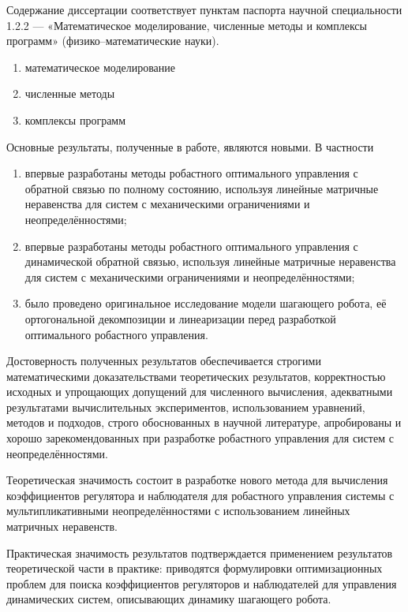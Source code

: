 {\compliances} 

Содержание диссертации соответствует пунктам паспорта научной специальности 1.2.2 --- «Математическое моделирование, численные методы и комплексы программ» (физико--математические науки).
\begin{enumerate}[beginpenalty=10000]
	\item математическое моделирование
	\item численные методы
	\item комплексы программ
\end{enumerate}

{\novelty}

Основные результаты, полученные в работе, являются новыми. В частности
\begin{enumerate}[beginpenalty=10000] %
	\item впервые разработаны методы робастного оптимального управления с обратной связью по полному состоянию, используя линейные матричные неравенства для систем с механическими ограничениями и неопределённостями;
	\item впервые разработаны методы робастного оптимального управления с динамической обратной связью, используя линейные матричные неравенства для систем с механическими ограничениями и неопределённостями;
	\item было проведено оригинальное исследование модели шагающего робота, её ортогональной декомпозиции и линеаризации перед разработкой оптимального робастного управления.
\end{enumerate}

{\probation}

Достоверность полученных результатов обеспечивается строгими математическими доказательствами теоретических результатов, корректностью исходных и упрощающих допущений для численного вычисления, адекватными результатами вычислительных экспериментов, использованием уравнений, методов и подходов, строго обоснованных в научной литературе, апробированы и хорошо зарекомендованных при разработке робастного управления для систем с неопределённостями. 

{\influence} 

Теоретическая значимость состоит в разработке нового метода для вычисления коэффициентов регулятора и наблюдателя для робастного управления системы с мультипликативными неопределённостями с использованием линейных матричных неравенств.

Практическая значимость результатов подтверждается применением результатов теоретической части в практике: приводятся формулировки оптимизационных проблем для поиска коэффициентов регуляторов и наблюдателей для управления динамических систем, описывающих динамику шагающего робота. 

